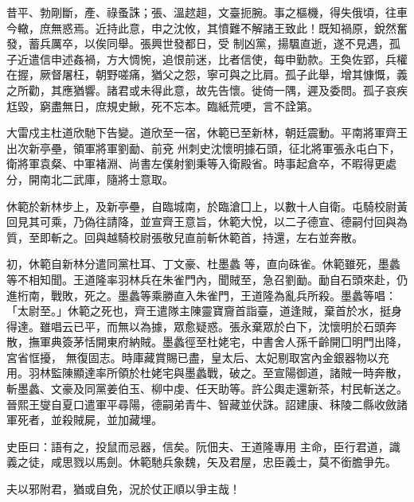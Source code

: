 \begin{pinyinscope}
 昔平、勃剛斷，產、祿蚤誅；張、溫趑趄，文臺扼腕。事之樞機，得失俄頃，往車今轍，庶無惑焉。近持此意，申之沈攸，其憤難不解諸王致此！既知禍原，銳然奮發，蓄兵厲卒，以俟同舉。張興世發都日，受
 制凶黨，揚颿直逝，遂不見遇，孤子近遣信申述姦禍，方大惆惋，追恨前迷，比者信使，每申勤款。王奐佐郢，兵權在握，厥督屠枉，朝野嗟痛，猶父之怨，寧可與之比肩。孤子此舉，增其慷慨，義之所勸，其應猶響。諸君或未得此意，故先告懷。徙倚一隅，遲及委問。孤子哀疾尪毀，窮盡無日，庶規史鰍，死不忘本。臨紙荒哽，言不詮第。



 大雷戍主杜道欣馳下告變。道欣至一宿，休範已至新林，朝廷震動。平南將軍齊王出次新亭壘，領軍將軍劉勔、前兗
 州刺史沈懷明據石頭，征北將軍張永屯白下，衛將軍袁粲、中軍褚淵、尚書左僕射劉秉等入衛殿省。時事起倉卒，不暇得更處分，開南北二武庫，隨將士意取。



 休範於新林步上，及新亭壘，自臨城南，於臨滄囗上，以數十人自衛。屯騎校尉黃回見其可乘，乃偽往請降，並宣齊王意旨，休範大悅，以二子德宣、德嗣付回與為質，至即斬之。回與越騎校尉張敬兒直前斬休範首，持還，左右並奔散。



 初，休範自新林分遣同黨杜耳、丁文豪、杜墨蠡
 等，直向硃雀。休範雖死，墨蠡等不相知聞。王道隆率羽林兵在朱雀門內，聞賊至，急召劉勔。勔自石頭來赴，仍進桁南，戰敗，死之。墨蠡等乘勝直入朱雀門，王道隆為亂兵所殺。墨蠡等唱：「太尉至。」休範之死也，齊王遣隊主陳靈寶齎首詣臺，道逢賊，棄首於水，挺身得達。雖唱云已平，而無以為據，眾愈疑惑。張永棄眾於白下，沈懷明於石頭奔散，撫軍典簽茅恬開東府納賊。墨蠡徑至杜姥宅，中書舍人孫千齡開囗明門出降，宮省恇擾，
 無復固志。時庫藏賞賜已盡，皇太后、太妃剔取宮內金銀器物以充用。羽林監陳顯達率所領於杜姥宅與墨蠡戰，破之。至宣陽御道，諸賊一時奔散，斬墨蠡、文豪及同黨姜伯玉、柳中虔、任天助等。許公輿走還新茶，村民斬送之。晉熙王燮自夏口遣軍平尋陽，德嗣弟青牛、智藏並伏誅。詔建康、秣陵二縣收斂諸軍死者，並殺賊屍，並加藏埋。



 史臣曰：語有之，投鼠而忌器，信矣。阮佃夫、王道隆專用
 主命，臣行君道，識義之徒，咸思戮以馬劍。休範馳兵象魏，矢及君屋，忠臣義士，莫不銜膽爭先。



 夫以邪附君，猶或自免，況於仗正順以爭主哉！



\end{pinyinscope}